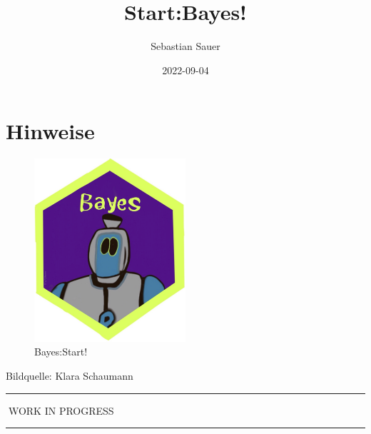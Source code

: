 \documentclass[
  a4paper,
  DIV=11]{scrreprt}
\title{Start:Bayes!}
\author{Sebastian Sauer}
\date{2022-09-04}
\renewcommand*\contentsname{Inhaltsverzeichnis}
\newcommand\contentsname{Inhaltsverzeichnis}
\theoremstyle{definition}
\theoremstyle{remark}
\begin{document}
\maketitle
\ifdefined\Shaded\renewenvironment{Shaded}{\begin{tcolorbox}[sharp corners, borderline west={3pt}{0pt}{shadecolor}, boxrule=0pt, breakable, enhanced, frame hidden, interior hidden]}{\end{tcolorbox}}\fi

\renewcommand*\contentsname{Inhaltsverzeichnis}
{
\hypersetup{linkcolor=}
\setcounter{tocdepth}{2}
\tableofcontents
}

\hypertarget{hinweise}{%
\chapter*{Hinweise}\label{hinweise}}

\begin{figure}

{\centering \includegraphics[width=0.5\textwidth,height=\textheight]{./img/Golem_hex.png}

}

\caption{Bayes:Start!}

\end{figure}

Bildquelle: Klara Schaumann

\begin{center}\rule{0.5\linewidth}{0.5pt}\end{center}

🚧WORK IN PROGRESS🚧

\begin{center}\rule{0.5\linewidth}{0.5pt}\end{center}
\end{document}
